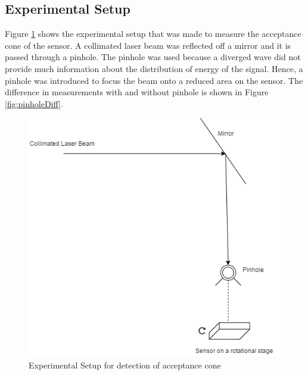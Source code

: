 \subsection{Experimental Setup}
Figure \ref{fig:exp_acc} shows the experimental setup that was made to measure the acceptance cone of the sensor. A collimated laser beam was reflected off a mirror and it is passed through a pinhole. The pinhole was used because a diverged wave did not provide much information about the distribution of energy of the signal. Hence, a pinhole was introduced to focus the beam onto a reduced area on the sensor. The difference in measurements with and without pinhole is shown in Figure \ref{fig:pinholeDiff}.
 \begin{figure}[ht]
\centering
\includegraphics[scale=0.50]{pics/acceptanceCone.png}
\caption{Experimental Setup for detection of acceptance cone}
\label{fig:exp_acc}
\end{figure}

